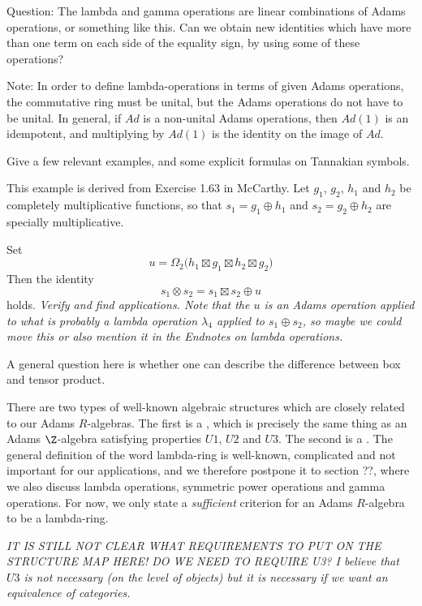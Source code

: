 \documentclass[a4paper]{article}
\begin{document}
Question: The lambda and gamma operations are linear combinations of Adams operations, or something like this. Can we obtain new identities which have more than one term on each side of the equality sign, by using some of these operations?


Note: In order to define lambda-operations in terms of given Adams operations, the commutative ring must be unital, but the Adams operations do not have to be unital. In general, if $Ad$ is a non-unital Adams operations, then $Ad(1)$ is an idempotent, and multiplying by $Ad(1)$ is the identity on the image of $Ad$. 

Give a few relevant examples, and some explicit formulas on Tannakian symbols.

\begin{example}
This example is derived from Exercise 1.63 in McCarthy. Let $g_1$, $g_2$, $h_1$ and $h_2$ be completely multiplicative functions, so that $s_1 = g_1 \oplus h_1$ and $s_2 = g_2 \oplus h_2$ are specially multiplicative.

Set
$$  u = \Omega_2 \big(  h_1 \boxtimes g_1 \boxtimes h_2 \boxtimes g_2   \big)  $$
Then the identity 
$$   s_1 \otimes s_2 = s_1 \boxtimes s_2 \oplus u  $$
holds. \emph{Verify and find applications. Note that the $u$ is an Adams operation applied to what is probably a lambda operation $\lambda_4$ applied to $s_1 \oplus s_2$, so maybe we could move this or also mention it in the Endnotes on lambda operations.}

A general question here is whether one can describe the difference between box and tensor product.

\end{example}


There are two types of well-known algebraic structures which are closely related to our Adams $R$-algebras. The first is a  , which is precisely the same thing as an Adams $\Z$-algebra satisfying properties $U1$, $U2$ and $U3$. The second is a . The general definition of the word lambda-ring is well-known, complicated and not important for our applications, and we therefore postpone it to section ??, where we also discuss lambda operations, symmetric power operations and gamma operations. For now, we only state a \emph{sufficient} criterion for an Adams $R$-algebra to be a lambda-ring.

\emph{IT IS STILL NOT CLEAR WHAT REQUIREMENTS TO PUT ON THE STRUCTURE MAP HERE! DO WE NEED TO REQUIRE U3? I believe that $U3$ is not necessary (on the level of objects) but it is necessary if we want an equivalence of categories.}
\end{document}
